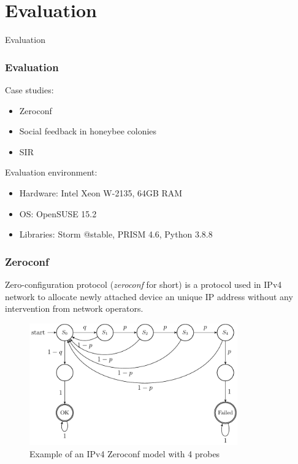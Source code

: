 \documentclass{beamer}
\begin{document}
\section{Evaluation}
\begin{frame}
    \begin{center}
        \Huge Evaluation
    \end{center}
\end{frame}

\begin{frame}
    \frametitle{Evaluation}
    Case studies:
    \begin{itemize}
        \item Zeroconf
        \item Social feedback in honeybee colonies
        \item SIR
    \end{itemize}
    Evaluation environment:
    \begin{itemize}
        \item Hardware: Intel Xeon W-2135, 64GB RAM
        \item OS: OpenSUSE 15.2
        \item Libraries: Storm @stable, PRISM 4.6, Python 3.8.8
    \end{itemize}
\end{frame}

\begin{frame}
    \frametitle{Zeroconf}
    Zero-configuration protocol (\textit{zeroconf} for short) \cite{ZeroConf} is a protocol used in
    IPv4 network to allocate newly attached device an unique IP address without any intervention
    from network operators.
    \begin{figure}[H]
        \centering
        \includegraphics[width=0.8\textwidth]{figures/zeroconf4_dtmc.png}
        \caption{Example of an IPv4 Zeroconf model with 4 probes}
        \label{fig:zeroconf4}
    \end{figure}
\end{frame}
\end{document}
